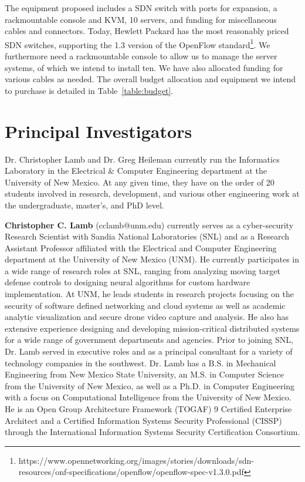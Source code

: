 \documentclass[12pt,letterpaper]{article}
\begin{document}
The equipment proposed includes a SDN switch with ports for expansion, a rackmountable console and KVM, 10 servers, and funding for miscellaneous cables and connectors. Today, Hewlett Packard has the most reasonably priced SDN switches, supporting the 1.3 version of the OpenFlow standard\footnote{https://www.opennetworking.org/images/stories/downloads/sdn-resources/onf-specifications/openflow/openflow-spec-v1.3.0.pdf}. We furthermore need a rackmountable console to allow us to manage the server systems, of which we intend to install ten. We have also allocated funding for various cables as needed. The overall budget allocation and equipment we intend to purchase is detailed in Table~\ref{table:budget}.


\newpage
\section{Principal Investigators}
Dr. Christopher Lamb and Dr. Greg Heileman currently run the Informatics Laboratory in the Electrical \& Computer Engineering department at the University of New Mexico. At any given time, they have on the order of 20 students involved in research, development, and various other engineering work at the undergraduate, master's, and PhD level.

{\bf Christopher C. Lamb} (cclamb@unm.edu) currently serves as a cyber-security Research Scientist with Sandia National Laboratories (SNL) and as a Research Assistant Professor affiliated with the Electrical and Computer Engineering department at the University of New Mexico (UNM). He currently participates in a wide range of research roles at SNL, ranging from analyzing moving target defense controls to designing neural algorithms for custom hardware implementation. At UNM, he leads students in research projects focusing on the security of software defined networking and cloud systems as well as academic analytic visualization and secure drone video capture and analysis. He also has extensive experience designing and developing mission-critical distributed systems for a wide range of government departments and agencies. Prior to joining SNL, Dr. Lamb served in executive roles and as a principal consultant for a variety of technology companies in the southwest. Dr. Lamb has a B.S. in Mechanical Engineering from New Mexico State University, an M.S. in Computer Science from the University of New Mexico, as well as a Ph.D. in Computer Engineering with a focus on Computational Intelligence from the University of New Mexico. He is an Open Group Architecture Framework (TOGAF) 9 Certified Enterprise Architect and a Certified Information Systems Security Professional (CISSP) through the International Information Systems Security Certification Consortium.
\end{document}
